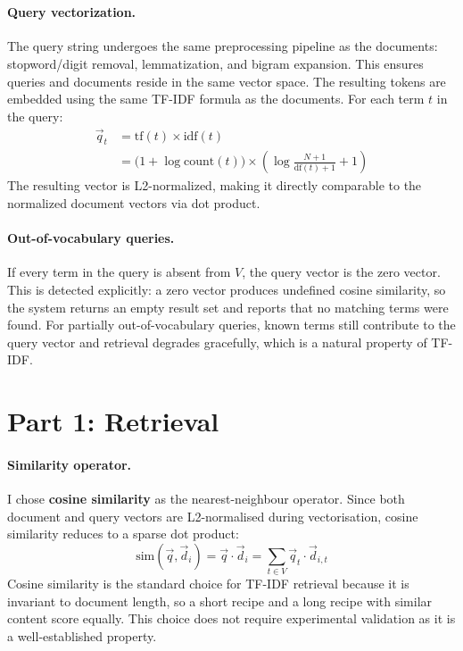 \documentclass[a4paper,11pt]{article}
\begin{document}
\paragraph{\\Query vectorization.}
The query string undergoes the same preprocessing pipeline as the documents: stopword/digit removal, lemmatization, and bigram expansion. This ensures queries and documents reside in the same vector space. The resulting tokens are embedded using the same TF-IDF formula as the documents. For each term $t$ in the query:
\begin{align*}
    \vec{q}_t &= \mathrm{tf}(t) \times \mathrm{idf}(t) \\
              &= \bigl(1 + \log \mathrm{count}(t)\bigr) \times \left(\log\frac{N+1}{\mathrm{df}(t)+1} + 1\right)
\end{align*}
The resulting vector is L2-normalized, making it directly comparable to the normalized document vectors via dot product.

\paragraph{Out-of-vocabulary queries.}
If every term in the query is absent from $V$, the query vector is the zero vector. This is detected explicitly: a zero vector produces undefined cosine similarity, so the system returns an empty result set and reports that no matching terms were found. For partially out-of-vocabulary queries, known terms still contribute to the query vector and retrieval degrades gracefully, which is a natural property of TF-IDF.

\newpage
\section*{Part 1: Retrieval}
\label{sec:retrieval}

\paragraph{Similarity operator.}
I chose  \textbf{cosine similarity} as the nearest-neighbour operator. Since both document and query vectors are L2-normalised during vectorisation, cosine similarity reduces to a sparse dot product:
\[
    \mathrm{sim}(\vec{q}, \vec{d}_i) = \vec{q} \cdot \vec{d}_i = \sum_{t \in V} \vec{q}_t \cdot \vec{d}_{i,t}
\]
Cosine similarity is the standard choice for TF-IDF retrieval \parencite{manning_introduction_2008} because it is invariant to document length, so a short recipe and a long recipe with similar content score equally. This choice does not require experimental validation as it is a well-established property.
\end{document}
